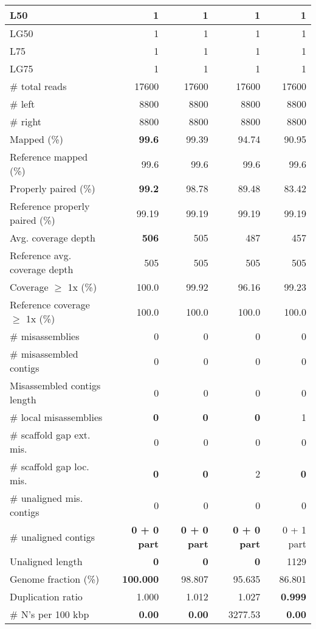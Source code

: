 \documentclass[12pt,a4paper]{article}
\begin{document}
\begin{table}[ht]
\begin{center}
\begin{tabular}{|l*{4}{|r}|}
L50 & 1 & 1 & 1 & 1 \\ \hline
LG50 & 1 & 1 & 1 & 1 \\ \hline
L75 & 1 & 1 & 1 & 1 \\ \hline
LG75 & 1 & 1 & 1 & 1 \\ \hline
\# total reads & 17600 & 17600 & 17600 & 17600 \\ \hline
\# left & 8800 & 8800 & 8800 & 8800 \\ \hline
\# right & 8800 & 8800 & 8800 & 8800 \\ \hline
Mapped (\%) & {\bf 99.6} & 99.39 & 94.74 & 90.95 \\ \hline
Reference mapped (\%) & 99.6 & 99.6 & 99.6 & 99.6 \\ \hline
Properly paired (\%) & {\bf 99.2} & 98.78 & 89.48 & 83.42 \\ \hline
Reference properly paired (\%) & 99.19 & 99.19 & 99.19 & 99.19 \\ \hline
Avg. coverage depth & {\bf 506} & 505 & 487 & 457 \\ \hline
Reference avg. coverage depth & 505 & 505 & 505 & 505 \\ \hline
Coverage $\geq$ 1x (\%) & 100.0 & 99.92 & 96.16 & 99.23 \\ \hline
Reference coverage $\geq$ 1x (\%) & 100.0 & 100.0 & 100.0 & 100.0 \\ \hline
\# misassemblies & 0 & 0 & 0 & 0 \\ \hline
\# misassembled contigs & 0 & 0 & 0 & 0 \\ \hline
Misassembled contigs length & 0 & 0 & 0 & 0 \\ \hline
\# local misassemblies & {\bf 0} & {\bf 0} & {\bf 0} & 1 \\ \hline
\# scaffold gap ext. mis. & 0 & 0 & 0 & 0 \\ \hline
\# scaffold gap loc. mis. & {\bf 0} & {\bf 0} & 2 & {\bf 0} \\ \hline
\# unaligned mis. contigs & 0 & 0 & 0 & 0 \\ \hline
\# unaligned contigs & {\bf 0 + 0 part} & {\bf 0 + 0 part} & {\bf 0 + 0 part} & 0 + 1 part \\ \hline
Unaligned length & {\bf 0} & {\bf 0} & {\bf 0} & 1129 \\ \hline
Genome fraction (\%) & {\bf 100.000} & 98.807 & 95.635 & 86.801 \\ \hline
Duplication ratio & 1.000 & 1.012 & 1.027 & {\bf 0.999} \\ \hline
\# N's per 100 kbp & {\bf 0.00} & {\bf 0.00} & 3277.53 & {\bf 0.00} \\ \hline

\end{tabular}
\end{center}
\end{table}
\end{document}
